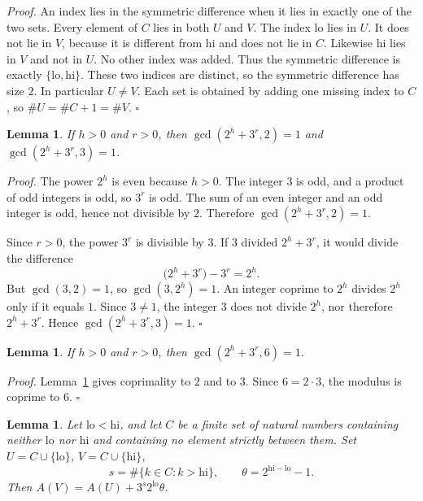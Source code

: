 \documentclass[11pt,letterpaper]{article}
\newtheorem{lemma}[theorem]{Lemma}
\newenvironment{proof}{\noindent\textit{Proof.}}{\hfill\(\square\)}
\begin{document}
\begin{proof}
An index lies in the symmetric difference when it lies in exactly one of the two sets. Every element of \(C\) lies in both \(U\) and \(V\). The index \(\mathrm{lo}\) lies in \(U\). It does not lie in \(V\), because it is different from \(\mathrm{hi}\) and does not lie in \(C\). Likewise \(\mathrm{hi}\) lies in \(V\) and not in \(U\). No other index was added. Thus the symmetric difference is exactly \(\{\mathrm{lo},\mathrm{hi}\}\). These two indices are distinct, so the symmetric difference has size \(2\). In particular \(U\neq V\). Each set is obtained by adding one missing index to \(C\), so \(\#U=\#C+1=\#V\).
\end{proof}

\begin{lemma}
\label{lem:coprime23}
If \(h>0\) and \(r>0\), then \(\gcd(2^{h}+3^{r},2)=1\) and \(\gcd(2^{h}+3^{r},3)=1\).
\end{lemma}

\begin{proof}
The power \(2^{h}\) is even because \(h>0\). The integer \(3\) is odd, and a product of odd integers is odd, so \(3^{r}\) is odd. The sum of an even integer and an odd integer is odd, hence not divisible by \(2\). Therefore \(\gcd(2^{h}+3^{r},2)=1\).

Since \(r>0\), the power \(3^{r}\) is divisible by \(3\). If \(3\) divided \(2^{h}+3^{r}\), it would divide the difference
\[
\bigl(2^{h}+3^{r}\bigr)-3^{r}=2^{h}.
\]
But \(\gcd(3,2)=1\), so \(\gcd(3,2^{h})=1\). An integer coprime to \(2^{h}\) divides \(2^{h}\) only if it equals \(1\). Since \(3\neq 1\), the integer \(3\) does not divide \(2^{h}\), nor therefore \(2^{h}+3^{r}\). Hence \(\gcd(2^{h}+3^{r},3)=1\).
\end{proof}

\begin{lemma}
\label{lem:coprime6}
If \(h>0\) and \(r>0\), then \(\gcd(2^{h}+3^{r},6)=1\).
\end{lemma}

\begin{proof}
Lemma~\ref{lem:coprime23} gives coprimality to \(2\) and to \(3\). Since \(6=2\cdot 3\), the modulus is coprime to \(6\).
\end{proof}

\begin{lemma}
\label{lem:difference}
Let \(\mathrm{lo}<\mathrm{hi}\), and let \(C\) be a finite set of natural numbers containing neither \(\mathrm{lo}\) nor \(\mathrm{hi}\) and containing no element strictly between them. Set \(U=C\cup\{\mathrm{lo}\}\), \(V=C\cup\{\mathrm{hi}\}\),
\[
s=\#\{k\in C:k>\mathrm{hi}\},\qquad\theta=2^{\mathrm{hi}-\mathrm{lo}}-1.
\]
Then \(A(V)=A(U)+3^{s}2^{\mathrm{lo}}\theta\).
\end{lemma}
\end{document}
